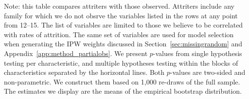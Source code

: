\begin{table}[H]
\begin{threeparttable}
\begin{tabular}{cccccccc}
  \hline\hline
  \end{tabular}
    \begin{tablenotes}
    \scriptsize
    \item 
        Note: this table compares attriters with those observed. Attriters include any family
        for which we do not obsrve the variables listed in the rows at any point from 12--15.
        The list of variables are limited to 
        those we believe to be correlated with rates of attrition. The same set of variables are used for 
        model selection when generating the IPW weights discussed in Section~\ref{sec:missingrandom} and 
        Appendix~\ref{app:method_partialobs}. We present $p$-values from single hypothesis testing
        per characteristic, and multiple hypotheses testing within the blocks of characteristics separated
        by the horizontal lines. Both $p$-values 
        are two-sided and non-parametric. We construct them based on 1,000 re-draws of the full sample. 
        The estimates we display are the means of the empirical bootstrap distribution. 
        
    \end{tablenotes}
  \end{threeparttable}

\end{table}